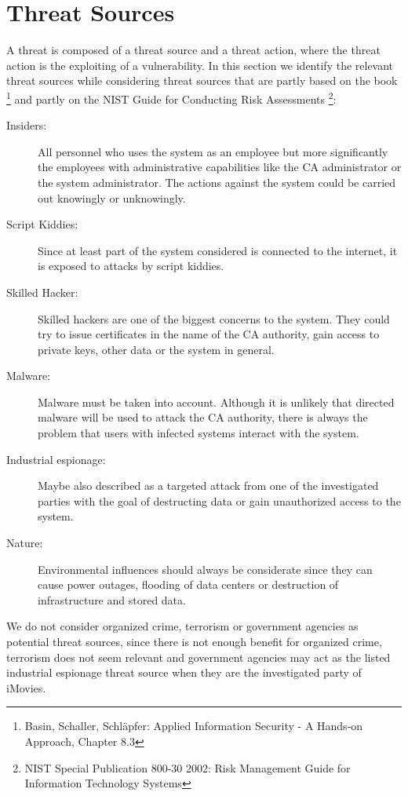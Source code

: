 \documentclass[a4paper, toc=index, 12pt, DIV14, twoside, BCOR2cm, headsepline, numbers=noenddot, bibliography=totoc]{report}
\begin{document}
\section{Threat Sources}
A threat is composed of a threat source and a threat action, where the threat action is the exploiting of a vulnerability. In this section we identify the relevant threat sources while considering threat sources that are partly based on the book \footnote{Basin, Schaller, Schläpfer: Applied Information Security - A Hands-on Approach, Chapter 8.3} and partly on the NIST Guide for Conducting Risk Assessments \footnote{NIST Special Publication 800-30 2002: Risk Management Guide for Information Technology Systems}:
\begin{description}
\item[Insiders:] All personnel who uses the system as an employee but more significantly the employees with administrative capabilities like the CA administrator or the system administrator. The actions against the system could be carried out knowingly or unknowingly.

\item[Script Kiddies:] Since at least part of the system considered is connected to the internet, it is exposed to attacks by script kiddies.

\item[Skilled Hacker:] Skilled hackers are one of the biggest concerns to the system. They could try to issue certificates in the name of the CA authority, gain access to private keys, other data or the system in general.

\item[Malware:] Malware must be taken into account. Although it is unlikely that directed malware will be used to attack the CA authority, there is always the problem that users with infected systems interact with the system.

\item[Industrial espionage: ] Maybe also described as a targeted attack from one of the investigated parties with the goal of destructing data or gain unauthorized access to the system.

\item[Nature: ] Environmental influences should always be considerate since they can cause power outages, flooding of data centers or destruction of infrastructure and stored data.
\end{description}
We do not consider organized crime, terrorism or government agencies as potential threat sources, since there is not enough benefit for organized crime, terrorism does not seem relevant and government agencies may act as the listed industrial espionage threat source when they are the investigated party of iMovies.
\end{document}
